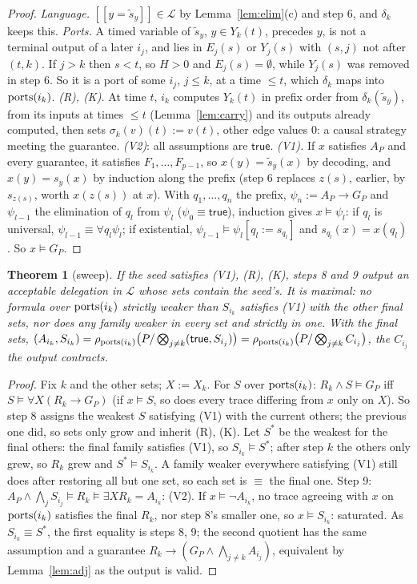\documentclass[10pt]{article}
\theoremstyle{tplain}\newtheorem{theorem}{Theorem}\newtheorem{lemma}[theorem]{Lemma}\newtheorem{proposition}[theorem]{Proposition}\newtheorem{corollary}[theorem]{Corollary}
\theoremstyle{tdef}\newtheorem{definition}[theorem]{Definition}
\newcommand{\TRUE}{\mathsf{true}}\newcommand{\FALSE}{\mathsf{false}}
\newcommand{\df}[1]{[\![#1]\!]}
\begin{document}
\begin{proof}
\emph{Language.} $\df{y=\tilde s_y}\in\mathcal L$ by Lemma~\ref{lem:elim}(c) and step 6, and $\delta_k$ keeps this. \emph{Ports.} A timed variable of $\tilde s_y$, $y\in Y_k(t)$, precedes $y$, is not a terminal output of a later $i_j$, and lies in $E_j(s)$ or $Y_j(s)$ with $(s,j)$ not after $(t,k)$. If $j>k$ then $s<t$, so $H>0$ and $E_j(s)=\emptyset$, while $Y_j(s)$ was removed in step 6. So it is a port of some $i_j$, $j\le k$, at a time $\le t$, which $\delta_k$ maps into $\mathrm{ports}(i_k)$. \emph{(R), (K).} At time $t$, $i_k$ computes $Y_k(t)$ in prefix order from $\delta_k(\tilde s_y)$, from its inputs at times $\le t$ (Lemma~\ref{lem:carry}) and its outputs already computed, then sets $\sigma_k(v)(t):=v(t)$, other edge values $0$: a causal strategy meeting the guarantee. \emph{(V2)}: all assumptions are $\TRUE$. \emph{(V1).} If $x$ satisfies $A_P$ and every guarantee, it satisfies $F_1,\dots,F_{p-1}$, so $x(y)=\tilde s_y(x)$ by decoding, and $x(y)=s_y(x)$ by induction along the prefix (step 6 replaces $z(s)$, earlier, by $s_{z(s)}$, worth $x(z(s))$ at $x$). With $q_1,\dots,q_n$ the prefix, $\psi_n:=A_P\to G_P$ and $\psi_{l-1}$ the elimination of $q_l$ from $\psi_l$ ($\psi_0\equiv\TRUE$), induction gives $x\models\psi_l$: if $q_l$ is universal, $\psi_{l-1}\equiv\forall q_l\psi_l$; if existential, $\psi_{l-1}\models\psi_l[q_l:=s_{q_l}]$ and $s_{q_l}(x)=x(q_l)$. So $x\models G_P$.
\end{proof}
\begin{theorem}[sweep]\label{thm:sweep}
If the seed satisfies (V1), (R), (K), steps 8 and 9 output an acceptable delegation in $\mathcal L$ whose sets contain the seed's. It is maximal: no formula over $\mathrm{ports}(i_k)$ strictly weaker than $S_{i_k}$ satisfies (V1) with the other final sets, nor does any family weaker in every set and strictly in one. With the final sets, $(A_{i_k},S_{i_k})=\rho_{\ports(i_k)}\big(P/\bigotimes_{j\ne k}(\TRUE,S_{i_j})\big)=\rho_{\ports(i_k)}\big(P/\bigotimes_{j\ne k}C_{i_j}\big)$, the $C_{i_j}$ the output contracts.
\end{theorem}
\begin{proof}
Fix $k$ and the other sets; $X:=X_k$. For $S$ over $\mathrm{ports}(i_k)$: $R_k\wedge S\models G_P$ iff $S\models\forall X(R_k\to G_P)$ (if $x\models S$, so does every trace differing from $x$ only on $X$). So step 8 assigns the weakest $S$ satisfying (V1) with the current others; the previous one did, so sets only grow and inherit (R), (K). Let $S^*$ be the weakest for the final others: the final family satisfies (V1), so $S_{i_k}\models S^*$; after step $k$ the others only grew, so $R_k$ grew and $S^*\models S_{i_k}$. A family weaker everywhere satisfying (V1) still does after restoring all but one set, so each set is $\equiv$ the final one. Step 9: $A_P\wedge\bigwedge_jS_{i_j}\models R_k\models\exists XR_k=A_{i_k}$: (V2). If $x\models\neg A_{i_k}$, no trace agreeing with $x$ on $\mathrm{ports}(i_k)$ satisfies the final $R_k$, nor step 8's smaller one, so $x\models S_{i_k}$: saturated. As $S_{i_k}\equiv S^*$, the first equality is steps 8, 9; the second quotient has the same assumption and a guarantee $R_k\to(G_P\wedge\bigwedge_{j\ne k}A_{i_j})$, equivalent by Lemma~\ref{lem:adj} as the output is valid.
\end{proof}
\end{document}
